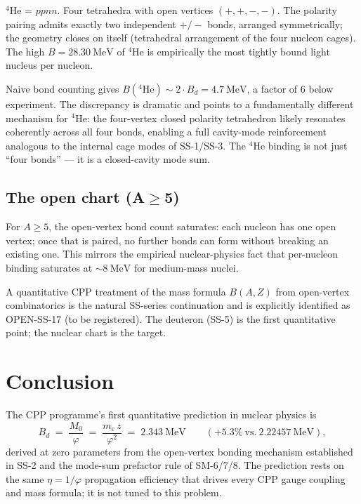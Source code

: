 \documentclass[11pt,letterpaper]{article}
\newcommand{\phig}{\varphi}
\newcommand{\Mzero}{M_0}
\newcommand{\Bd}{B_{d}}
\begin{document}
${}^{4}\mathrm{He}$ = $ppnn$. Four tetrahedra with open vertices $(+, +, -, -)$. The polarity pairing admits exactly two independent $+/-$ bonds, arranged symmetrically; the geometry closes on itself (tetrahedral arrangement of the four nucleon cages). The high $B = 28.30~\mathrm{MeV}$ of ${}^{4}\mathrm{He}$ is empirically the most tightly bound light nucleus per nucleon.

Naive bond counting gives $B({}^{4}\mathrm{He}) \sim 2 \cdot \Bd = 4.7~\mathrm{MeV}$, a factor of $6$ below experiment. The discrepancy is dramatic and points to a fundamentally different mechanism for ${}^{4}\mathrm{He}$: the four-vertex closed polarity tetrahedron likely resonates coherently across all four bonds, enabling a full cavity-mode reinforcement analogous to the internal cage modes of SS-1/SS-3. The ${}^{4}\mathrm{He}$ binding is not just ``four bonds'' --- it is a closed-cavity mode sum.

\subsection{The open chart (A$\geq$5)}

For $A \geq 5$, the open-vertex bond count saturates: each nucleon has one open vertex; once that is paired, no further bonds can form without breaking an existing one. This mirrors the empirical nuclear-physics fact that per-nucleon binding saturates at $\sim 8~\mathrm{MeV}$ for medium-mass nuclei.

A quantitative CPP treatment of the mass formula $B(A, Z)$ from open-vertex combinatorics is the natural SS-series continuation and is explicitly identified as OPEN-SS-17 (to be registered). The deuteron (SS-5) is the first quantitative point; the nuclear chart is the target.

\section{Conclusion}
\label{sec:conclusion}

The CPP programme's first quantitative prediction in nuclear physics is
\[
\Bd \;=\; \frac{\Mzero}{\phig} \;=\; \frac{m_e\, z}{\phig^{2}} \;=\; 2.343~\mathrm{MeV} \qquad (+5.3\%~\mathrm{vs.}~2.22457~\mathrm{MeV}),
\]
derived at zero parameters from the open-vertex bonding mechanism established in SS-2 and the mode-sum prefactor rule of SM-6/7/8. The prediction rests on the same $\eta = 1/\phig$ propagation efficiency that drives every CPP gauge coupling and mass formula; it is not tuned to this problem.
\end{document}
